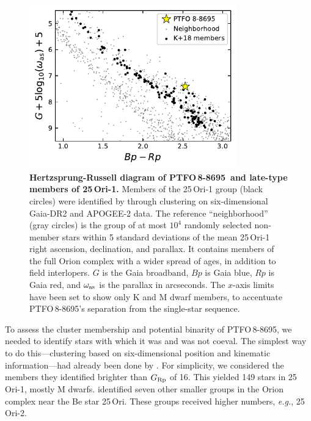 \documentclass[12pt,twocolumn,tighten]{aastex62}
\newcommand{\ptfo}{PTFO$\,$8-8695}
\begin{document}
\begin{figure}[t]
	\begin{center}
		\leavevmode
		\includegraphics[width=0.8\textwidth]{f5.pdf}
	\end{center}
	\vspace{-0.7cm}
  \caption{ {\bf Hertzsprung-Russell diagram of \ptfo\ and late-type
  members of 25$\,$Ori-1.}
  Members of the 25$\,$Ori-1 group (black circles) were identified by
  \citet{kounkel_apogee2_2018} through clustering on six-dimensional
  Gaia-DR2 and APOGEE-2 data.  The reference ``neighborhood'' (gray
  circles) is the group of at most $10^4$ randomly selected non-member
  stars within 5 standard deviations of the mean 25$\,$Ori-1 right
  ascension, declination, and parallax.  It contains members of the
  full Orion complex with a wider spread of ages, in addition to field
  interlopers.  $G$ is the Gaia broadband, $Bp$ is Gaia blue, $Rp$ is
  Gaia red, and $\omega_{\rm as}$ is the parallax in arcseconds.  The
  $x$-axis limits have been set to show only K and M dwarf members, to
  accentuate \ptfo's separation from the single-star sequence.
	\label{fig:gaia}
	}
\end{figure}

\citet{schmidt_direct_2016}
\citet{lee_evidence_2018}

To assess the cluster membership and potential binarity of \ptfo, we
needed to identify stars with which it was and was not coeval.  The
simplest way to do this---clustering based on six-dimensional position
and kinematic information---had already been done by
\citet{kounkel_apogee2_2018}.  For simplicity, we considered the
members they identified brighter than $G_{\rm Rp}$ of 16.  This
yielded 149 stars in 25$\,$Ori-1, mostly M dwarfs.
\citet{kounkel_apogee2_2018} identified seven other smaller groups in
the Orion complex near the Be star 25$\,$Ori. These groups received
higher numbers, {\it e.g.}, 25$\,$Ori-2.
\end{document}
